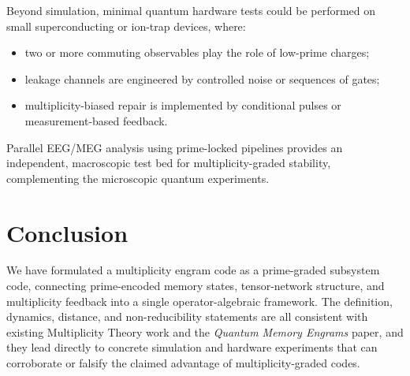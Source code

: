 \documentclass[11pt]{article}
\begin{document}
Beyond simulation, minimal quantum hardware tests could be performed on small
superconducting or ion-trap devices, where:
\begin{itemize}[leftmargin=*]
  \item two or more commuting observables play the role of low-prime charges;
  \item leakage channels are engineered by controlled noise or sequences of
        gates;
  \item multiplicity-biased repair is implemented by conditional pulses or
        measurement-based feedback.
\end{itemize}

Parallel EEG/MEG analysis using prime-locked pipelines provides an
independent, macroscopic test bed for multiplicity-graded stability,
complementing the microscopic quantum experiments.

\section*{Conclusion}

We have formulated a multiplicity engram code as a prime-graded subsystem
code, connecting prime-encoded memory states, tensor-network structure, and
multiplicity feedback into a single operator-algebraic framework. The
definition, dynamics, distance, and non-reducibility statements are all
consistent with existing Multiplicity Theory work and the \emph{Quantum
Memory Engrams} paper, and they lead directly to concrete simulation and
hardware experiments that can corroborate or falsify the claimed advantage
of multiplicity-graded codes.

\nocite{*}


\end{document}
